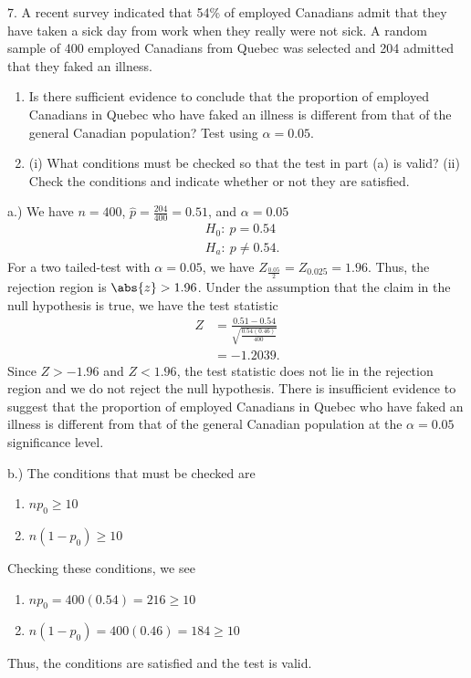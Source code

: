 \documentclass{report}
\begin{document}
\pagebreak \bigbreak \noindent 
\begin{mdframed}
7. A recent survey indicated that 54\% of employed Canadians admit that they have taken a sick day from work when they really were not sick. A random sample of 400 employed Canadians from Quebec was selected and 204 admitted that they faked an illness.
    \begin{enumerate}[label=(\alph*)]
        \item Is there sufficient evidence to conclude that the proportion of employed Canadians in Quebec who have faked an illness is different from that of the general Canadian population? Test using $\alpha = 0.05$.
        \item (i) What conditions must be checked so that the test in part (a) is valid? (ii) Check the conditions and indicate whether or not they are satisfied.
    \end{enumerate}
\end{mdframed}
\bigbreak \noindent 
a.) We have $n=400$, $\hat{p} = \frac{204}{400} = 0.51$, and $\alpha = 0.05$
\begin{align*}
    &H_{0}:\ p = 0.54 \\
    &H_{a}:\ p \ne 0.54
.\end{align*}
\bigbreak \noindent 
For a two tailed-test with $\alpha=0.05$, we have $Z_{\frac{0.05}{2}} = Z_{0.025} = 1.96$. Thus, the rejection region is $\abs{z} > 1.96$. Under the assumption that the claim in the null hypothesis is true, we have the test statistic
\begin{align*}
    Z &= \frac{0.51 -0.54}{\sqrt{\frac{0.54(0.46)}{400}}} \\
    &=-1.2039
.\end{align*}
\bigbreak \noindent 
Since $Z > -1.96$ and $Z < 1.96$, the test statistic does not lie in the rejection region and we do not reject the null hypothesis. There is insufficient evidence to suggest that the proportion of employed Canadians in Quebec who have faked an illness is different from that of the general Canadian population at the $\alpha=0.05$ significance level.

\bigbreak \noindent 
b.) The conditions that must be checked are
\begin{enumerate}
    \item $np_{0} \geq 10 $
    \item $n(1-p_{0}) \geq 10 $
\end{enumerate}
Checking these conditions, we see
\begin{enumerate}
    \item $np_{0} = 400(0.54) = 216 \geq 10 $
    \item $n(1-p_{0}) = 400(0.46) = 184 \geq 10 $ 
\end{enumerate}
\bigbreak \noindent 
Thus, the conditions are satisfied and the test is valid.





 
\end{document}

